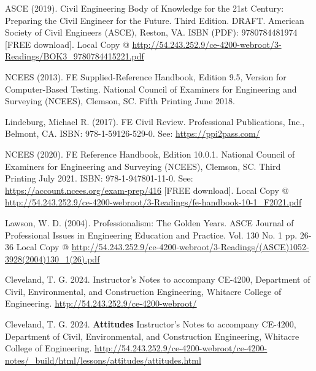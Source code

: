 \documentclass[12pt]{article}
\begin{document}

\clearpage



\begin{thebibliography}{}

ASCE (2019). Civil Engineering Body of Knowledge for the 21st Century: Preparing the Civil
Engineer for the Future. Third Edition. DRAFT. American Society of Civil Engineers (ASCE),
Reston, VA. ISBN (PDF): 9780784481974 [FREE download]. Local Copy @ \url{http://54.243.252.9/ce-4200-webroot/3-Readings/BOK3_9780784415221.pdf}

NCEES (2013). FE Supplied-Reference Handbook, Edition 9.5, Version for Computer-Based
Testing. National Council of Examiners for Engineering and Surveying (NCEES), Clemson,
SC. Fifth Printing June 2018.

Lindeburg, Michael R. (2017). FE Civil Review. Professional Publications, Inc., Belmont,
CA. ISBN: 978-1-59126-529-0. See: \url{https://ppi2pass.com/}

NCEES (2020). FE Reference Handbook, Edition 10.0.1. National Council of Examiners for
Engineering and Surveying (NCEES), Clemson, SC. Third Printing July 2021. ISBN: 978-1-947801-11-0.
See: \url{https://account.ncees.org/exam‐prep/416} [FREE download]. Local Copy @ \url{http://54.243.252.9/ce-4200-webroot/3-Readings/fe-handbook-10-1_F2021.pdf}

Lawson, W. D. (2004). Professionalism: The Golden Years. 
ASCE Journal of Professional Issues in Engineering Education and Practice. Vol. 130 No. 1 pp. 26-36
Local Copy @ \url{http://54.243.252.9/ce-4200-webroot/3-Readings/(ASCE)1052-3928(2004)130_1(26).pdf}

Cleveland, T. G. 2024. Instructor's Notes to accompany CE-4200, Department of Civil, Environmental, and Construction Engineering, Whitacre College of Engineering. \url{http://54.243.252.9/ce-4200-webroot/}

Cleveland, T. G. 2024. \textbf{Attitudes} Instructor's Notes to accompany CE-4200, Department of Civil, Environmental, and Construction Engineering, Whitacre College of Engineering. \url{http://54.243.252.9/ce-4200-webroot/ce-4200-notes/_build/html/lessons/attitudes/attitudes.html}


\end{thebibliography}
\end{document}
